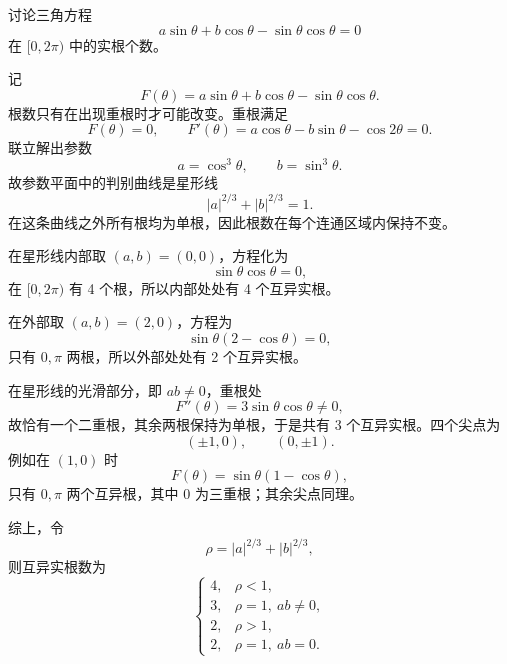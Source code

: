 \begin{xreferenceproblem}[19]
讨论三角方程
  \[
    a\sin\theta+b\cos\theta-\sin\theta\cos\theta=0
  \]
  在 $[0,2\pi)$ 中的实根个数。
\end{xreferenceproblem}
\begin{xsolution}
记
\[
  F(\theta)=a\sin\theta+b\cos\theta-\sin\theta\cos\theta.
\]
根数只有在出现重根时才可能改变。重根满足
\[
  F(\theta)=0,
  \qquad
  F'(\theta)=a\cos\theta-b\sin\theta-\cos2\theta=0.
\]
联立解出参数
\[
  a=\cos^3\theta,
  \qquad
  b=\sin^3\theta.
\]
故参数平面中的判别曲线是星形线
\[
  |a|^{2/3}+|b|^{2/3}=1.
\]
在这条曲线之外所有根均为单根，因此根数在每个连通区域内保持不变。

在星形线内部取 $(a,b)=(0,0)$，方程化为
\[
  \sin\theta\cos\theta=0,
\]
在 $[0,2\pi)$ 有 4 个根，所以内部处处有 4 个互异实根。

在外部取 $(a,b)=(2,0)$，方程为
\[
  \sin\theta(2-\cos\theta)=0,
\]
只有 $0,\pi$ 两根，所以外部处处有 2 个互异实根。

在星形线的光滑部分，即 $ab\ne0$，重根处
\[
  F''(\theta)=3\sin\theta\cos\theta\ne0,
\]
故恰有一个二重根，其余两根保持为单根，于是共有 3 个互异实根。四个尖点为
\[
  (\pm1,0),\qquad(0,\pm1).
\]
例如在 $(1,0)$ 时
\[
  F(\theta)=\sin\theta(1-\cos\theta),
\]
只有 $0,\pi$ 两个互异根，其中 $0$ 为三重根；其余尖点同理。

综上，令
\[
  \rho=|a|^{2/3}+|b|^{2/3},
\]
则互异实根数为
\[
  \boxed{
  \begin{cases}
    4,&\rho<1,\\
    3,&\rho=1,\ ab\ne0,\\
    2,&\rho>1,\\
    2,&\rho=1,\ ab=0.
  \end{cases}}
\]
\end{xsolution}


